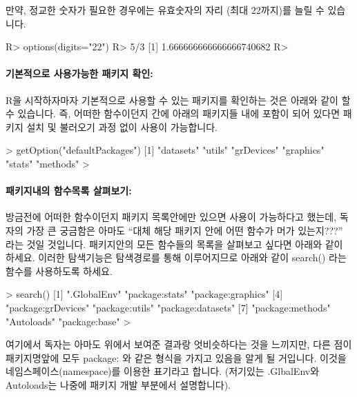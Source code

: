 만약, 정교한 숫자가 필요한 경우에는 유효숫자의 자리 (최대 22까지)를 늘릴 수 있습니다. 

\begin{Schunk}
\begin{Soutput}
R> options(digits="22")
R> 5/3
[1] 1.666666666666666740682
R> 
\end{Soutput}
\end{Schunk}

\paragraph{기본적으로 사용가능한 패키지 확인:} 
R을 시작하자마자 기본적으로 사용할 수 있는 패키지를 확인하는 것은 아래와 같이 할 수 있습니다. 
즉, 어떠한 함수이던지 간에 아래의 패키지들 내에 포함이 되어 있다면 패키지 설치 및 불러오기 과정 없이 사용이 가능합니다. 
 
\begin{Schunk}
\begin{Soutput}
> getOption("defaultPackages")
[1] "datasets"  "utils"     "grDevices" "graphics"  "stats"     "methods"  
> 
\end{Soutput}
\end{Schunk}

\paragraph{패키지내의 함수목록 살펴보기: }
방금전에 어떠한 함수이던지 패키지 목록안에만 있으면 사용이 가능하다고 했는데, 독자의 가장 큰 궁금함은 아마도 ``대체 해당 패키지 안에 어떤 함수가 머가 있는지???'' 라는 것일 것입니다. 
패키지안의 모든 함수들의 목록을 살펴보고 싶다면 아래와 같이 하세요.
이러한 탐색기능은 탐색경로를 통해 이루어지므로 아래와 같이 search() 라는 함수를 사용하도록 하세요.

\begin{Schunk}
\begin{Soutput}
> search()
[1] ".GlobalEnv"        "package:stats"     "package:graphics" 
[4] "package:grDevices" "package:utils"     "package:datasets" 
[7] "package:methods"   "Autoloads"         "package:base"     
> 
\end{Soutput}
\end{Schunk}

여기에서 독자는 아마도 위에서 보여준 결과랑 엇비슷하다는 것을 느끼지만, 다른 점이 패키지명앞에 모두 package: 와 같은 형식을 가지고 있음을 알게 될 거입니다. 
이것을 네임스페이스(namespace)를 이용한 표기라고 합니다. 
(저기있는 .GlbalEnv와 Autoloads는 나중에 패키지 개발 부분에서 설명합니다).

